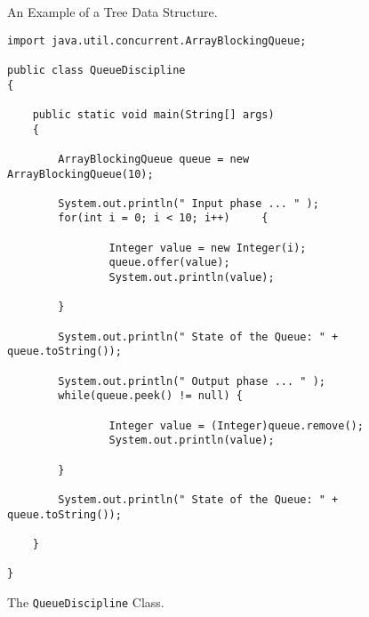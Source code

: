 \documentclass[12pt]{article}
\begin{document}
\begin{enumerate}
\begin{figure}[h]
  \caption{An Example of a Tree Data Structure.}
  \label{tree}

\end{figure}

\newpage

\begin{figure}[t]

\footnotesize{
\begin{verbatim}
import java.util.concurrent.ArrayBlockingQueue;

public class QueueDiscipline
{

    public static void main(String[] args)
    {

        ArrayBlockingQueue queue = new ArrayBlockingQueue(10);

        System.out.println(" Input phase ... " );
        for(int i = 0; i < 10; i++)	    {

                Integer value = new Integer(i);
                queue.offer(value);
                System.out.println(value);

        }

        System.out.println(" State of the Queue: " + queue.toString());

        System.out.println(" Output phase ... " );
        while(queue.peek() != null) {

                Integer value = (Integer)queue.remove();
                System.out.println(value);

        }

        System.out.println(" State of the Queue: " + queue.toString());

    }

}
\end{verbatim}
}

\caption{The {\tt QueueDiscipline} Class.}
\label{Queue}
\end{figure}





\end{enumerate}
\end{document}

